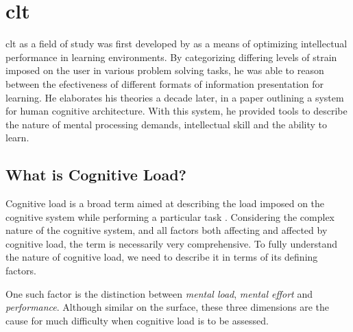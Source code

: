 \section{\acrlong{clt}} \label{sec:bt/CLT}

\acrfull{clt} as a field of study was first developed by \textcite{sweller1988} as a means of optimizing intellectual performance in learning environments. By categorizing differing levels of strain imposed on the user in various problem solving tasks, he was able to reason between the efectiveness of different formats of information presentation for learning. He elaborates his theories a decade later, in a paper outlining a system for human cognitive architecture. With this system, he provided tools to describe the nature of mental processing demands, intellectual skill and the ability to learn.



\subsection{What is Cognitive Load?}


Cognitive load is a broad term aimed at describing the load imposed on the cognitive system while performing a particular task \cite{paas1994}. Considering the complex nature of the cognitive system, and all factors both affecting and affected by cognitive load, the term is necessarily very comprehensive. To fully understand the nature of cognitive load, we need to describe it in terms of its defining factors. 

One such factor is the distinction between \textit{mental load}, \textit{mental effort} and \textit{performance}. Although similar on the surface, these three dimensions are the cause for much difficulty when cognitive load is to be assessed.

